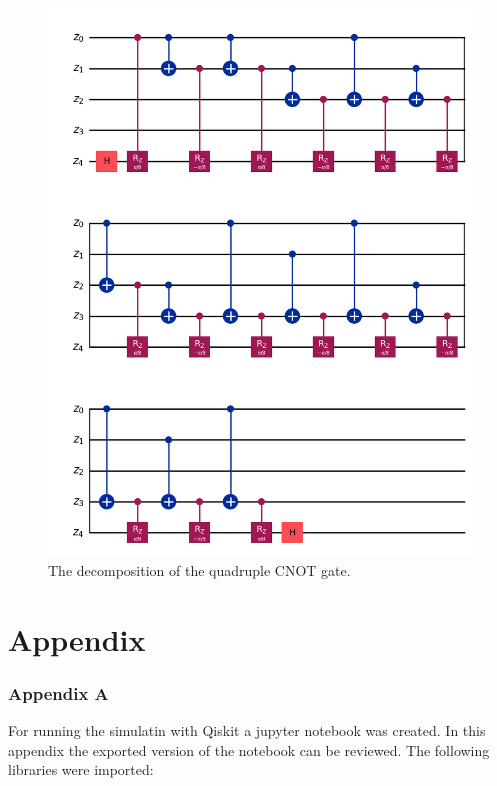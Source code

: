 \documentclass[12pt,a4paper]{article}
\begin{document}
\begin{figure}[htbp] 
    \centering \includegraphics[width=1\textwidth]{Figures/quad_cnot_decomposition.png} 
    \caption{The decomposition of the quadruple CNOT gate.} 
    \label{fig:quad_cnot_decomp} 
\end{figure}


\newpage





\newpage

\section{Appendix}

\subsubsection{Appendix A}
\label{appendix_a}

For running the simulatin with Qiskit a jupyter notebook was created. In this appendix the exported version of the notebook can be reviewed.
The following libraries were imported:
\end{document}
